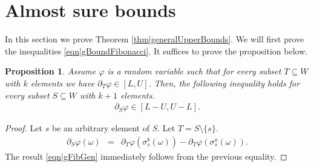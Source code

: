 \documentclass[reqno]{amsart}
\newtheorem{proposition}[theorem]{Proposition}
\begin{document}
 
 
    
 


\section{Almost sure bounds}
In this section we prove Theorem \ref{thm|generalUpperBounds}.
We will first prove the inequalities \eqref{eqn|gBoundFibonacci}. It suffices to prove the proposition below. 
\begin{proposition} Assume $\varphi$ is a random variable such that for every subset $T\subseteq W$ with $k$ elements we have $\partial_T\varphi\in [L,U]$. Then, the following inequality holds for every subset $S\subseteq W$ with $k+1$ elements. 
\begin{eqnarray}
\partial_S\varphi\in[L-U,U-L].
\label{eqn|gFibGen}
\end{eqnarray}
\end{proposition}
\begin{proof}
Let $s$ be an arbitrary element of $S$. Let $T=S\setminus \{s\}$. 
\begin{eqnarray*} \partial_S\varphi(\omega)&=&\partial_T\varphi(\sigma_s^b(\omega))-\partial_T\varphi(\sigma_s^a(\omega)).
\end{eqnarray*}
The result \eqref{eqn|gFibGen} immediately follows from the previous equality.
\end{proof}
\end{document}
